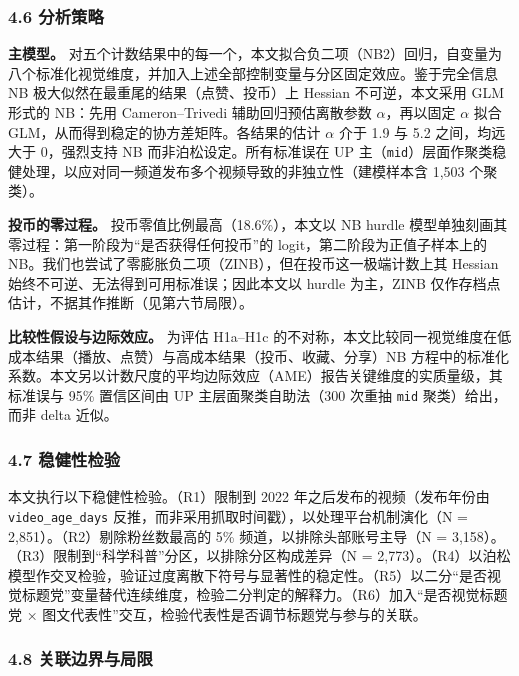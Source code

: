 \documentclass[
  fontset=none]{ctexart}
\begin{document}
\subsubsection{4.6 分析策略}\label{ux5206ux6790ux7b56ux7565}

\textbf{主模型。} 对五个计数结果中的每一个，本文拟合负二项（NB2）回归，自变量为八个标准化视觉维度，并加入上述全部控制变量与分区固定效应。鉴于完全信息 NB 极大似然在最重尾的结果（点赞、投币）上 Hessian 不可逆，本文采用 GLM 形式的 NB：先用 Cameron--Trivedi 辅助回归预估离散参数 \(\alpha\)，再以固定 \(\alpha\) 拟合 GLM，从而得到稳定的协方差矩阵。各结果的估计 \(\alpha\) 介于 1.9 与 5.2 之间，均远大于 0，强烈支持 NB 而非泊松设定。所有标准误在 UP 主（\texttt{mid}）层面作聚类稳健处理，以应对同一频道发布多个视频导致的非独立性（建模样本含 1{,}503 个聚类）。

\textbf{投币的零过程。} 投币零值比例最高（18.6\%），本文以 NB hurdle 模型单独刻画其零过程：第一阶段为``是否获得任何投币''的 logit，第二阶段为正值子样本上的 NB。我们也尝试了零膨胀负二项（ZINB），但在投币这一极端计数上其 Hessian 始终不可逆、无法得到可用标准误；因此本文以 hurdle 为主，ZINB 仅作存档点估计，不据其作推断（见第六节局限）。

\textbf{比较性假设与边际效应。} 为评估 H1a--H1c 的不对称，本文比较同一视觉维度在低成本结果（播放、点赞）与高成本结果（投币、收藏、分享）NB 方程中的标准化系数。本文另以计数尺度的平均边际效应（AME）报告关键维度的实质量级，其标准误与 95\% 置信区间由 UP 主层面聚类自助法（300 次重抽 \texttt{mid} 聚类）给出，而非 delta 近似。

\subsubsection{4.7 稳健性检验}\label{ux7a33ux5065ux6027ux68c0ux9a8c}

本文执行以下稳健性检验。（R1）限制到 2022 年之后发布的视频（发布年份由 \texttt{video\_age\_days} 反推，而非采用抓取时间戳），以处理平台机制演化（N = 2{,}851）。（R2）剔除粉丝数最高的 5\% 频道，以排除头部账号主导（N = 3{,}158）。（R3）限制到``科学科普''分区，以排除分区构成差异（N = 2{,}773）。（R4）以泊松模型作交叉检验，验证过度离散下符号与显著性的稳定性。（R5）以二分``是否视觉标题党''变量替代连续维度，检验二分判定的解释力。（R6）加入``是否视觉标题党 × 图文代表性''交互，检验代表性是否调节标题党与参与的关联。

\subsubsection{4.8 关联边界与局限}\label{ux56e0ux679cux8fb9ux754cux4e0eux5c40ux9650}
\end{document}
